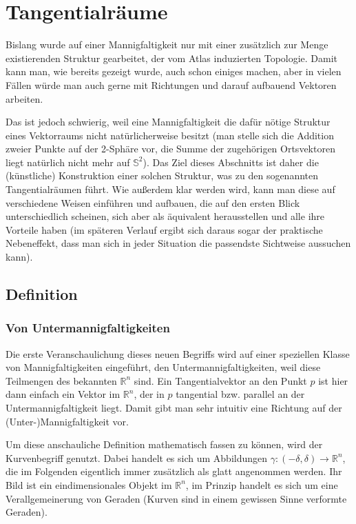 \documentclass[../H_Analysis_main.tex]{subfiles}
\begin{document}
\setcounter{chapter}{2}

\chapter{Tangentialräume}
\begin{center}
Bislang wurde auf einer Mannigfaltigkeit nur mit einer zusätzlich zur Menge existierenden Struktur gearbeitet, der vom Atlas induzierten Topologie. Damit kann man, wie bereits gezeigt wurde, auch schon einiges machen, aber in vielen Fällen würde man auch gerne mit Richtungen und darauf aufbauend Vektoren arbeiten.

Das ist jedoch schwierig, weil eine Mannigfaltigkeit die dafür nötige Struktur eines Vektorraums nicht natürlicherweise besitzt (man stelle sich die Addition zweier Punkte auf der 2-Sphäre vor, die Summe der zugehörigen Ortsvektoren liegt natürlich nicht mehr auf $\mathbb{S}^2$). Das Ziel dieses Abschnitts ist daher die (künstliche) Konstruktion einer solchen Struktur, was zu den sogenannten Tangentialräumen führt. Wie außerdem klar werden wird, kann man diese auf verschiedene Weisen einführen und aufbauen, die auf den ersten Blick unterschiedlich scheinen, sich aber als äquivalent herausstellen und alle ihre Vorteile haben (im späteren Verlauf ergibt sich daraus sogar der praktische Nebeneffekt, dass man sich in jeder Situation die passendste Sichtweise aussuchen kann).
\end{center}


\newpage


	\section{Definition}%
		\subsection{Von Untermannigfaltigkeiten}
Die erste Veranschaulichung dieses neuen Begriffs wird auf einer speziellen Klasse von Mannigfaltigkeiten eingeführt, den Untermannigfaltigkeiten, weil diese Teilmengen des bekannten $\mathbb{R}^n$ sind. Ein Tangentialvektor an den Punkt $p$ ist hier dann einfach ein Vektor im $\mathbb{R}^n$, der in $p$ tangential bzw. parallel an der Untermannigfaltigkeit liegt. Damit gibt man sehr intuitiv eine Richtung auf der (Unter-)Mannigfaltigkeit vor.

Um diese anschauliche Definition mathematisch fassen zu können, wird der Kurvenbegriff genutzt. Dabei handelt es sich um Abbildungen $\gamma: (-\delta, \delta) \rightarrow \mathbb{R}^n$, die im Folgenden eigentlich immer zusätzlich als glatt angenommen werden. Ihr Bild ist ein eindimensionales Objekt im $\mathbb{R}^n$, im Prinzip handelt es sich um eine Verallgemeinerung von Geraden (Kurven sind in einem gewissen Sinne verformte Geraden).
\end{document}
